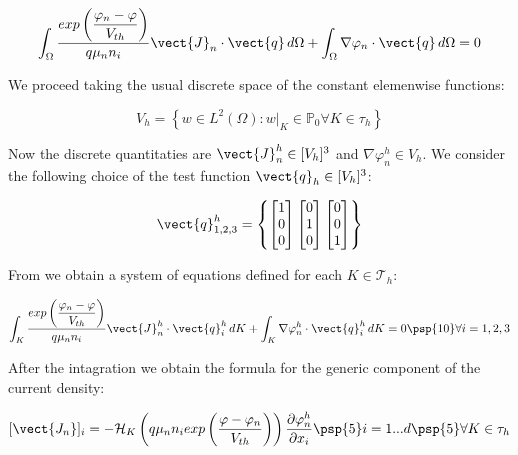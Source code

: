 \begin{equation}
\label{eq: variation form of current density continuos}
\int_\Omega \dfrac{ exp \left( \dfrac{\varphi_n-\varphi}{V_{th}} \right) }{q \mu_n n_i} \vect{J}_n \cdot \vect{q} \, d\Omega
 + \int_\Omega \nabla \varphi_n \cdot \vect{q} \, d\Omega = 0 
\end{equation}


We proceed taking the usual discrete space of the constant elemenwise functions:

\begin{equation}
\label{eq: spaces elementwise constant}
V_h=\left\{ w \in L^2(\Omega) : w|_{K}\in \mathbb{P}_0 \forall K \in \tau_h\right\}
\end{equation}

Now the discrete quantitaties are $\vect{J}_n^h\in[V_h]^3$ and $\nabla \varphi_n^h \in V_h$. We consider the following choice of the test function $\vect{q}_h \in [V_h]^3$:

\begin{equation}
\label{eq: form of qh}
\vect{q}^h_{1,2,3} = \left\{ \begin{bmatrix} 1 \\ 0 \\ 0 \end{bmatrix}  \begin{bmatrix} 0 \\ 1 \\ 0 \end{bmatrix}  \begin{bmatrix} 0 \\ 0 \\ 1 \end{bmatrix}  \right\}
\end{equation}

From  we obtain a system of equations defined for each $K \in \mathcal{T}_h$:

\begin{equation}
\label{eq: variation form of current density}
\int_K \dfrac{ exp \left( \dfrac{\varphi_n-\varphi}{V_{th}} \right) }{q \mu_n n_i} \vect{J}_n^h \cdot \vect{q}^h_i \, dK
 + \int_K \nabla \varphi_n^h \cdot \vect{q}^h_i \, dK = 0 \psp{10} \forall i=1,2,3
\end{equation}

After the intagration we obtain the formula for the generic component of the current density:

\begin{equation}
\label{eq: first formula for J}
[\vect{J_n}]_i = - \mathcal{H}_K \left( q \mu_n n_i exp \left( \dfrac{\varphi-\varphi_n}{V_{th}} \right)  \right) \dfrac{\partial \varphi_n^h}{\partial x_i} \psp{5} i = 1...d \psp{5} \forall K \in \tau_h
\end{equation}


